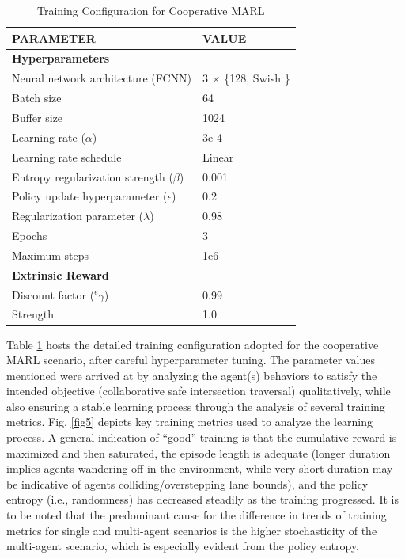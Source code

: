 \documentclass[letterpaper, 10 pt, conference]{ieeeconf}  %
\begin{document}
\begin{table}[t]
	\caption{Training Configuration for Cooperative MARL}
	\begin{center}
		\begin{tabular}{l|l}
			\hline
			\textbf{PARAMETER}                        & \textbf{VALUE}        \\ \hline
            \multicolumn{2}{l}{\textbf{Hyperparameters}}                      \\ \hline
			Neural network architecture (FCNN)        & 3 $\times$ \{128, Swish \cite{ramachandran2017}\} \\
			Batch size                                & 64                    \\
			Buffer size                               & 1024                  \\
			Learning rate ($\alpha$)                  & 3e-4                  \\
			Learning rate schedule                    & Linear                \\
			Entropy regularization strength ($\beta$) & 0.001                 \\
			Policy update hyperparameter ($\epsilon$) & 0.2                   \\
			Regularization parameter ($\lambda$)      & 0.98                  \\
			Epochs                                    & 3                     \\
			Maximum steps                             & 1e6                   \\ \hline
			\multicolumn{2}{l}{\textbf{Extrinsic Reward}}                     \\ \hline
			Discount factor ($^{e}\gamma$)            & 0.99                  \\
			Strength                                  & 1.0                   \\ \hline
		\end{tabular}
	\end{center}
	\label{tab1}
\end{table}

Table \ref{tab1} hosts the detailed training configuration adopted for the cooperative MARL scenario, after careful hyperparameter tuning. The parameter values mentioned were arrived at by analyzing the agent(s) behaviors to satisfy the intended objective (collaborative safe intersection traversal) qualitatively, while also ensuring a stable learning process through the analysis of several training metrics. Fig. \ref{fig5} depicts key training metrics used to analyze the learning process. A general indication of ``good'' training is that the cumulative reward is maximized and then saturated, the episode length is adequate (longer duration implies agents wandering off in the environment, while very short duration may be indicative of agents colliding/overstepping lane bounds), and the policy entropy (i.e., randomness) has decreased steadily as the training progressed. It is to be noted that the predominant cause for the difference in trends of training metrics for single and multi-agent scenarios is the higher stochasticity of the multi-agent scenario, which is especially evident from the policy entropy.
\end{document}
